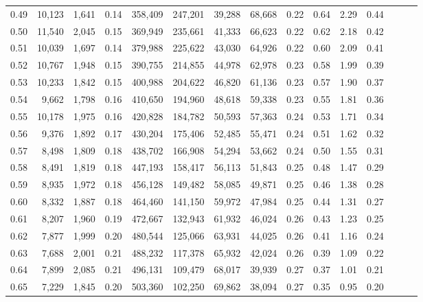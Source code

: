 \begin{tabular}{rrrrrrrrrrrrrrr}
0.49 &  10,123 &  1,641 &  0.14 &  358,409 &  247,201 &   39,288 &   68,668 &  0.22 &  0.64 &  2.29 &      0.44 \\
0.50 &  11,540 &  2,045 &  0.15 &  369,949 &  235,661 &   41,333 &   66,623 &  0.22 &  0.62 &  2.18 &      0.42 \\
0.51 &  10,039 &  1,697 &  0.14 &  379,988 &  225,622 &   43,030 &   64,926 &  0.22 &  0.60 &  2.09 &      0.41 \\
0.52 &  10,767 &  1,948 &  0.15 &  390,755 &  214,855 &   44,978 &   62,978 &  0.23 &  0.58 &  1.99 &      0.39 \\
0.53 &  10,233 &  1,842 &  0.15 &  400,988 &  204,622 &   46,820 &   61,136 &  0.23 &  0.57 &  1.90 &      0.37 \\
0.54 &   9,662 &  1,798 &  0.16 &  410,650 &  194,960 &   48,618 &   59,338 &  0.23 &  0.55 &  1.81 &      0.36 \\
0.55 &  10,178 &  1,975 &  0.16 &  420,828 &  184,782 &   50,593 &   57,363 &  0.24 &  0.53 &  1.71 &      0.34 \\
0.56 &   9,376 &  1,892 &  0.17 &  430,204 &  175,406 &   52,485 &   55,471 &  0.24 &  0.51 &  1.62 &      0.32 \\
0.57 &   8,498 &  1,809 &  0.18 &  438,702 &  166,908 &   54,294 &   53,662 &  0.24 &  0.50 &  1.55 &      0.31 \\
0.58 &   8,491 &  1,819 &  0.18 &  447,193 &  158,417 &   56,113 &   51,843 &  0.25 &  0.48 &  1.47 &      0.29 \\
0.59 &   8,935 &  1,972 &  0.18 &  456,128 &  149,482 &   58,085 &   49,871 &  0.25 &  0.46 &  1.38 &      0.28 \\
0.60 &   8,332 &  1,887 &  0.18 &  464,460 &  141,150 &   59,972 &   47,984 &  0.25 &  0.44 &  1.31 &      0.27 \\
0.61 &   8,207 &  1,960 &  0.19 &  472,667 &  132,943 &   61,932 &   46,024 &  0.26 &  0.43 &  1.23 &      0.25 \\
0.62 &   7,877 &  1,999 &  0.20 &  480,544 &  125,066 &   63,931 &   44,025 &  0.26 &  0.41 &  1.16 &      0.24 \\
0.63 &   7,688 &  2,001 &  0.21 &  488,232 &  117,378 &   65,932 &   42,024 &  0.26 &  0.39 &  1.09 &      0.22 \\
0.64 &   7,899 &  2,085 &  0.21 &  496,131 &  109,479 &   68,017 &   39,939 &  0.27 &  0.37 &  1.01 &      0.21 \\
0.65 &   7,229 &  1,845 &  0.20 &  503,360 &  102,250 &   69,862 &   38,094 &  0.27 &  0.35 &  0.95 &      0.20 \\

\end{tabular}
